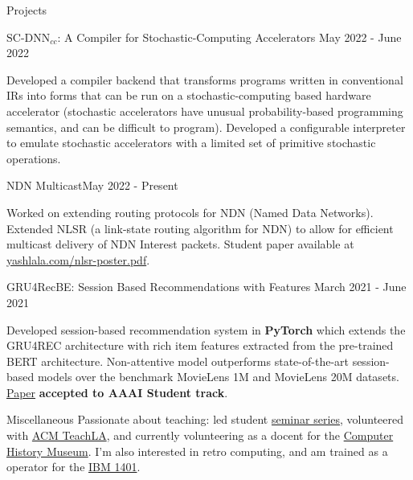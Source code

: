 \documentclass{resume} %
\begin{document}
\begin{resumeSection}{Projects} \itemsep -10pt

\begin{resumeSubsection}
	{$\text{SC-DNN}_{cc}$: A Compiler for Stochastic-Computing Accelerators}
	{May 2022 - June 2022}{}{}
\item Developed a compiler backend that transforms programs written in
	conventional IRs into forms that can be run on a stochastic-computing
	based hardware accelerator (stochastic accelerators have unusual
	probability-based programming semantics, and can be difficult to
	program). Developed a configurable interpreter to emulate 
	stochastic accelerators with a limited set of primitive stochastic
	operations. 
\end{resumeSubsection}

\begin{resumeSubsection}{NDN Multicast}{May 2022 - Present}{}{}
\item Worked on extending routing protocols for NDN (Named Data Networks). 
	Extended NLSR (a link-state routing algorithm for NDN) to allow for
	efficient multicast delivery of NDN Interest packets. 
	Student paper available at 
	\href{https://yashlala.com/nlsr-poster.pdf}{yashlala.com/nlsr-poster.pdf}. 
\end{resumeSubsection}

\begin{resumeSubsection}{GRU4RecBE: Session Based Recommendations with Features}
	{March 2021 - June 2021}{}{}
\item Developed session-based recommendation system in \textbf{PyTorch} which
	extends the GRU4REC architecture with rich item features extracted from
	the pre-trained BERT architecture. Non-attentive model outperforms
	state-of-the-art session-based models over the benchmark MovieLens 1M
	and MovieLens 20M datasets.
	\href{https://ojs.aaai.org/index.php/AAAI/article/view/21651/21400}{Paper}
	\textbf{accepted to AAAI Student track}.
\end{resumeSubsection}

\end{resumeSection}


\begin{resumeSection}{Miscellaneous}
	Passionate about teaching: led student 
	\href{https://yashlala.com/binary-search-club/}{seminar series}, 
	volunteered with \href{https://teachla.uclaacm.com/}{ACM TeachLA}, 
	and currently volunteering as a docent for the 
	\href{https://computerhistory.org/}{Computer History Museum}. 
	I'm also interested in retro computing, and am trained as a operator
	for the \href{https://en.wikipedia.org/wiki/IBM_1401}{IBM 1401}. 
\end{resumeSection}
\end{document}
